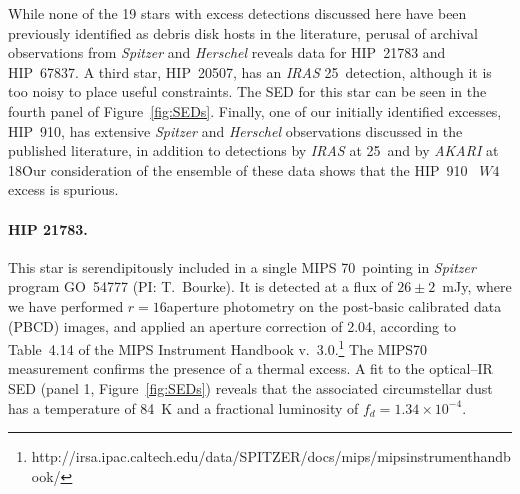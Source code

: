 While none of the 19 %
stars with excess detections discussed here have been previously identified as debris disk hosts in the literature, perusal of archival observations from \textit{ Spitzer} and \textit{ Herschel} reveals data for HIP~21783 and HIP~67837.  A third star, HIP~20507,  has an \textit{ IRAS} 25\micron\ detection, although it is too noisy to place useful constraints. The SED for this star can be seen in the fourth panel of Figure~\ref{fig:SEDs}. Finally, one of our initially identified excesses, HIP~910, has extensive \textit{ Spitzer} and \textit{ Herschel} observations discussed in the published literature, in addition to detections by \textit{ IRAS} at 25\micron\ and by \textit{ AKARI} at 18\micron\.  Our consideration of the ensemble of these data shows that the HIP~910 \WS\ $W4$ excess is spurious.


\paragraph{HIP 21783.} 
This star is serendipitously included in a single MIPS 70\micron\ pointing in \textit{ Spitzer} program GO~54777 (PI: T.~Bourke).  It is detected at a flux of $26\pm2$~mJy, where we have performed $r=16$\arcsec aperture photometry on the post-basic calibrated data (PBCD) images, and applied an aperture correction of 2.04, according to Table~4.14 of the MIPS Instrument Handbook v.\ 3.0.\footnote{http://irsa.ipac.caltech.edu/data/SPITZER/docs/mips/mipsinstrumenthandbook/}  The MIPS70 measurement confirms the presence of a thermal excess.  A fit to the optical--IR SED (panel 1, Figure~\ref{fig:SEDs}) reveals that the associated circumstellar dust has a temperature of 84~K and a fractional luminosity of $f_d=1.34\times10^{-4}$.


